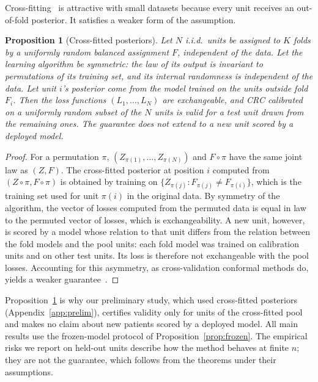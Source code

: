 \documentclass[sn-mathphys-num]{sn-jnl}%
\theoremstyle{thmstyleone}
\newtheorem{proposition}{Proposition}
\theoremstyle{thmstyletwo}
\theoremstyle{thmstylethree}
\newcommand{\1}{\mathbb{1}}
\begin{document}
Cross-fitting~\cite{barber2021jackknife} is attractive with small datasets because every unit receives an out-of-fold posterior. It satisfies a weaker form of the assumption.

\begin{proposition}[Cross-fitted posteriors]\label{prop:crossfit}
Let $N$ i.i.d.\ units be assigned to $K$ folds by a uniformly random balanced assignment $F$, independent of the data. Let the learning algorithm be symmetric: the law of its output is invariant to permutations of its training set, and its internal randomness is independent of the data. Let unit $i$'s posterior come from the model trained on the units outside fold $F_i$. Then the loss functions $(L_1,\dots,L_N)$ are exchangeable, and CRC calibrated on a uniformly random subset of the $N$ units is valid for a test unit drawn from the remaining ones. The guarantee does not extend to a new unit scored by a deployed model.
\end{proposition}
\begin{proof}
For a permutation $\pi$, $(Z_{\pi(1)},\dots,Z_{\pi(N)})$ and $F\circ\pi$ have the same joint law as $(Z,F)$. The cross-fitted posterior at position $i$ computed from $(Z\circ\pi,F\circ\pi)$ is obtained by training on $\{Z_{\pi(j)}:F_{\pi(j)}\ne F_{\pi(i)}\}$, which is the training set used for unit $\pi(i)$ in the original data. By symmetry of the algorithm, the vector of losses computed from the permuted data is equal in law to the permuted vector of losses, which is exchangeability. A new unit, however, is scored by a model whose relation to that unit differs from the relation between the fold models and the pool units: each fold model was trained on calibration units and on other test units. Its loss is therefore not exchangeable with the pool losses. Accounting for this asymmetry, as cross-validation conformal methods do, yields a weaker guarantee~\cite{barber2021jackknife}.
\end{proof}

Proposition~\ref{prop:crossfit} is why our preliminary study, which used cross-fitted posteriors (Appendix~\ref{app:prelim}), certifies validity only for units of the cross-fitted pool and makes no claim about new patients scored by a deployed model. All main results use the frozen-model protocol of Proposition~\ref{prop:frozen}. The empirical risks we report on held-out units describe how the method behaves at finite $n$; they are not the guarantee, which follows from the theorems under their assumptions.
\end{document}
